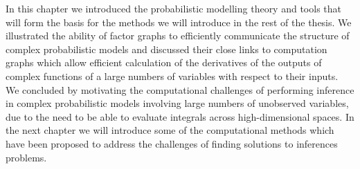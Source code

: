 In this chapter we introduced the probabilistic modelling theory and tools that will form the basis for the methods we will introduce in the rest of the thesis. We illustrated the ability of factor graphs to efficiently communicate the structure of complex probabilistic models and discussed their close links to computation graphs which allow efficient calculation of the derivatives of the outputs of complex functions of a large numbers of variables with respect to their inputs. We concluded by motivating the computational challenges of performing inference in complex probabilistic models involving large numbers of unobserved variables, due to the need to be able to evaluate integrals across high-dimensional spaces. In the next chapter we will introduce some of the computational methods which have been proposed to address the challenges of finding solutions to inferences problems.

